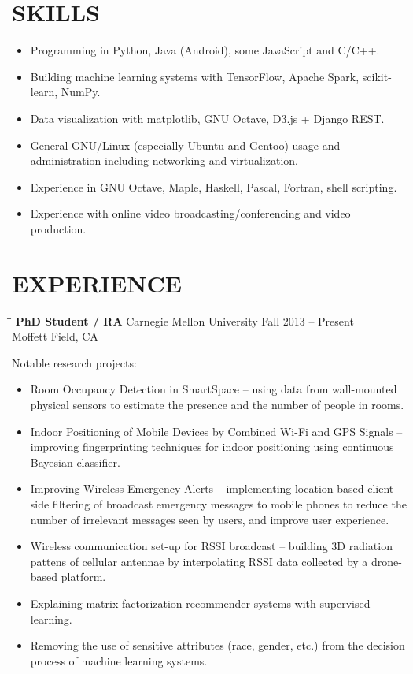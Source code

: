 \documentclass{res}
\begin{document}
\begin{resume}
\section{SKILLS}          
\begin{itemize}
	\item
		Programming in Python, Java (Android), some JavaScript and C/C++.
	\item
		Building machine learning systems with TensorFlow, Apache Spark, scikit-learn, NumPy.
	\item
		Data visualization with matplotlib, GNU Octave, D3.js + Django REST.
	\item
		General GNU/Linux (especially Ubuntu and Gentoo) usage and administration including networking and virtualization.
	\item
		Experience in GNU Octave, Maple, Haskell, Pascal, Fortran, shell scripting.
	\item
		Experience with online video broadcasting/conferencing and video production.
\end{itemize}
 
\section{EXPERIENCE}
\vspace{-0.1in}	
\begin{tabbing}
\hspace{2in}\= \hspace{2in}\= \kill %
{\bf PhD Student / RA} \>Carnegie Mellon University \>Fall 2013 -- Present\\
			\>Moffett Field, CA \> 
\end{tabbing}      %
Notable research projects:
\begin{itemize}
	\item
		Room Occupancy Detection in SmartSpace -- using data from wall-mounted physical sensors to estimate the presence and the number of people in rooms.
	\item
		Indoor Positioning of Mobile Devices by Combined Wi-Fi and GPS Signals -- improving fingerprinting techniques for indoor positioning using continuous Bayesian classifier.
	\item
		Improving Wireless Emergency Alerts -- implementing location-based client-side filtering of broadcast emergency messages to mobile phones to reduce the number of irrelevant messages seen by users, and improve user experience.
	\item
		Wireless communication set-up for RSSI broadcast -- building 3D radiation pattens of cellular antennae by interpolating RSSI data collected by a drone-based platform.
	\item
		Explaining matrix factorization recommender systems with supervised learning.
	\item
		Removing the use of sensitive attributes (race, gender, etc.) from the decision process of machine learning systems.	
\end{itemize}


\end{resume}
\end{document}
